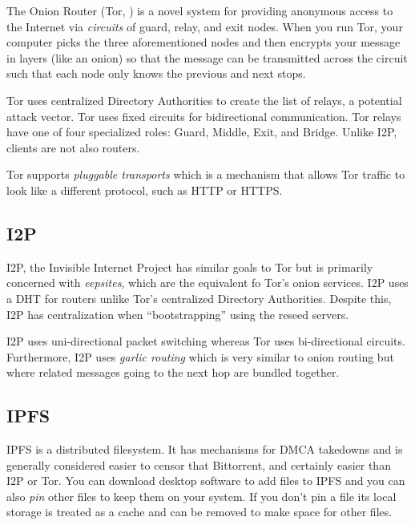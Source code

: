 The Onion Router (Tor, \cite{TorProjectPrivacy}) is a novel system for providing
anonymous access to the Internet via \emph{circuits} of guard, relay, and exit
nodes. When you run Tor, your computer picks the three aforementioned nodes and
then encrypts your message in layers (like an onion) so that the message can be
transmitted across the circuit such that each node only knows the previous and
next stops.



Tor uses centralized Directory Authorities \cite{TorProjectDirectory} to create
the list of relays, a potential attack vector. Tor uses fixed circuits for
bidirectional communication.\cite{AnalyzingTrendsTor} Tor relays have one of
four specialized roles: Guard, Middle, Exit, and Bridge. Unlike I2P, clients are
not also routers.

Tor supports \emph{pluggable transports} \label{pluggable_transports} which is a
mechanism that allows Tor traffic to look like a different protocol, such as
HTTP or HTTPS.

\subsection{I2P}\label{i2p}

I2P, the Invisible Internet Project \cite{I2PAnonymousNetwork} has similar
goals to Tor but is primarily concerned with \emph{eepsites}, which are the
equivalent fo Tor's onion services. I2P uses a DHT for routers unlike Tor's
centralized Directory Authorities.\cite{NetworkDatabaseI2P} Despite this, I2P
has centralization when ``bootstrapping'' using the reseed servers.

I2P uses uni-directional packet switching \cite{I2PComparedTor} whereas Tor uses
bi-directional circuits. Furthermore, I2P uses \emph{garlic routing} which is
very similar to onion routing but where related messages going to the next hop
are bundled together.

\subsection{IPFS}\label{ipfs}

IPFS \cite{IPFSBuildingBlocks} is a distributed filesystem. It has mechanisms
for DMCA takedowns and is generally considered easier to censor that Bittorrent,
and certainly easier than I2P or Tor. You can download desktop software to add
files to IPFS and you can also \emph{pin} other files to keep them on your
system. If you don't pin a file its local storage is treated as a cache
\cite{HostSinglepageWebsite} and can be removed to make space for other files.

